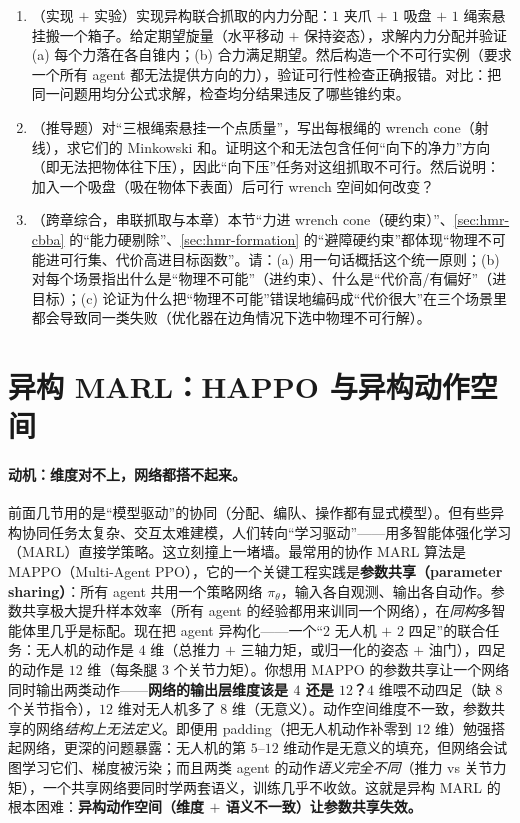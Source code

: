 \begin{practice}
\begin{enumerate}
  \item （实现 $+$ 实验）实现异构联合抓取的内力分配：$1$ 夹爪 $+$ $1$ 吸盘 $+$ $1$ 绳索悬挂搬一个箱子。给定期望旋量（水平移动 $+$ 保持姿态），求解内力分配并验证 (a) 每个力落在各自锥内；(b) 合力满足期望。然后构造一个不可行实例（要求一个所有 agent 都无法提供方向的力），验证可行性检查正确报错。对比：把同一问题用均分公式求解，检查均分结果违反了哪些锥约束。
  \item （推导题）对“三根绳索悬挂一个点质量”，写出每根绳的 wrench cone（射线），求它们的 Minkowski 和。证明这个和无法包含任何“向下的净力”方向（即无法把物体往下压），因此“向下压”任务对这组抓取不可行。然后说明：加入一个吸盘（吸在物体下表面）后可行 wrench 空间如何改变？
  \item （跨章综合，串联抓取与本章）本节“力进 wrench cone（硬约束）”、\cref{sec:hmr-cbba} 的“能力硬剔除”、\cref{sec:hmr-formation} 的“避障硬约束”都体现“物理不可能进可行集、代价高进目标函数”。请：(a) 用一句话概括这个统一原则；(b) 对每个场景指出什么是“物理不可能”（进约束）、什么是“代价高/有偏好”（进目标）；(c) 论证为什么把“物理不可能”错误地编码成“代价很大”在三个场景里都会导致同一类失败（优化器在边角情况下选中物理不可行解）。
\end{enumerate}
\end{practice}

\section{异构 MARL：HAPPO 与异构动作空间}
\label{sec:hmr-marl}

\paragraph{动机：维度对不上，网络都搭不起来。}
前面几节用的是“模型驱动”的协同（分配、编队、操作都有显式模型）。但有些异构协同任务太复杂、交互太难建模，人们转向“学习驱动”——用多智能体强化学习（MARL）直接学策略。这立刻撞上一堵墙。最常用的协作 MARL 算法是 MAPPO（Multi-Agent PPO），它的一个关键工程实践是\textbf{参数共享（parameter sharing）}：所有 agent 共用一个策略网络 $\pi_\theta$，输入各自观测、输出各自动作。参数共享极大提升样本效率（所有 agent 的经验都用来训同一个网络），在\emph{同构}多智能体里几乎是标配。现在把 agent 异构化——一个“$2$ 无人机 $+$ $2$ 四足”的联合任务：无人机的动作是 $4$ 维（总推力 $+$ 三轴力矩，或归一化的姿态 $+$ 油门），四足的动作是 $12$ 维（每条腿 $3$ 个关节力矩）。你想用 MAPPO 的参数共享让一个网络同时输出两类动作——\textbf{网络的输出层维度该是 $4$ 还是 $12$？}$4$ 维喂不动四足（缺 $8$ 个关节指令），$12$ 维对无人机多了 $8$ 维（无意义）。动作空间维度不一致，参数共享的网络\emph{结构上无法定义}。即便用 padding（把无人机动作补零到 $12$ 维）勉强搭起网络，更深的问题暴露：无人机的第 $5$--$12$ 维动作是无意义的填充，但网络会试图学习它们、梯度被污染；而且两类 agent 的动作\emph{语义完全不同}（推力 vs 关节力矩），一个共享网络要同时学两套语义，训练几乎不收敛。这就是异构 MARL 的根本困难：\textbf{异构动作空间（维度 $+$ 语义不一致）让参数共享失效。}

